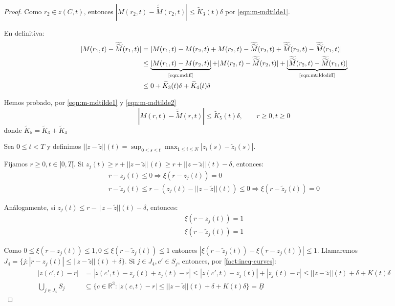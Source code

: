 \documentclass[a4paper,10pt]{scrartcl}
\theoremstyle{definition}
\newcommand{\ktilde}{\widetilde{K}}
\newcommand{\dtilde}[1]{\widetilde{\widetilde{#1}}}
\numberwithin{equation}{section}
\begin{document}
\begin{proof}
 Como $r_2 \in z(C,t)$, entonces $|M(r_2,t) - \dtilde{M}(r_2,t)| \le \ktilde_3(t) \delta$ por \eqref{eqn:m-mdtilde1}.
 
 En definitiva:
 \begin{align}  
|M(r_1,t) - \dtilde{M}(r_1,t)| &= |M(r_1,t) - M(r_2,t) + M(r_2,t) - \dtilde{M}(r_2,t) + \dtilde{M}(r_2,t) - \dtilde{M}(r_1,t)| \nonumber \\
&\le \underbrace{|M(r_1,t) - M(r_2,t)|}_{\textrm{\eqref{eqn:mdiff}}} + |M(r_2,t) - \dtilde{M}(r_2,t)| + \underbrace{|\dtilde{M}(r_2,t) - \dtilde{M}(r_1,t)|}_{\textrm{\eqref{eqn:mtildediff}}} \nonumber \\
&\le 0 + \ktilde_3(t) \delta + \ktilde_4(t) \delta \label{eqn:m-mdtilde2}
 \end{align}

 Hemos probado, por \eqref{eqn:m-mdtilde1} y  \eqref{eqn:m-mdtilde2}
 \begin{equation}
  |M(r,t) - \dtilde{M}(r,t)| \le \ktilde_5(t) \delta, \qquad r\ge 0, t\ge 0
  \label{eqn:m-mdtilde}
 \end{equation}
 donde $\ktilde_5 = \ktilde_3 + \ktilde_4$

 Sea $0\le t < T$ y definimos $||z-\widetilde{z}||(t) = \sup_{0\le s \le t} \max_{1\le i\le N} |z_i(s) - \widetilde{z}_i(s)|$.
 
 Fijamos $r\ge 0, t\in [0, T[$. Si $z_j(t) \ge r + ||z - \widetilde{z}||(t) \ge r + ||z - \widetilde{z}||(t) - \delta$, entonces:
 \begin{align*}
  r - z_j(t) \le 0 \Rightarrow \xi(r - z_j(t)) = 0\\
  r - \widetilde{z}_j(t) \le r - (z_j(t) - ||z-\widetilde{z}||(t)) \le 0 \Rightarrow \xi(r - \widetilde{z}_j(t)) = 0
 \end{align*}
 
 Análogamente, si $z_j(t) \le r - ||z - \widetilde{z}||(t) - \delta$, entonces:
  \begin{align*}
  \xi(r - z_j(t)) = 1\\
  \xi(r - \widetilde{z}_j(t)) = 1
 \end{align*}
 
 Como $0 \le \xi(r - z_j(t)) \le 1, 0 \le \xi(r - \widetilde{z}_j(t)) \le 1$ entonces $|\xi(r - \widetilde{z}_j(t)) - \xi(r - z_j(t))| \le 1$. Llamaremos $J_4 = \{j: |r-z_j(t)| \le ||z - \widetilde{z}||(t) + \delta\}$.  Si $j\in J_4, c' \in S_j$, entonces, por \cref{fact:ineq-curves}:
 \begin{align*}
  |z(c',t) - r| &= |z(c',t) - z_j(t) + z_j(t) - r| \le |z(c',t) - z_j(t)| + |z_j(t) - r| \le ||z-\widetilde{z}||(t) + \delta + K(t)\delta\\
  \bigcup_{j\in J_4} S_j &\subseteq \{c\in \mathbb{R}^3: |z(c,t) - r| \le ||z-\widetilde{z}||(t) + \delta + K(t)\delta\} = \underline{B}
 \end{align*}


\end{proof}
\end{document}
